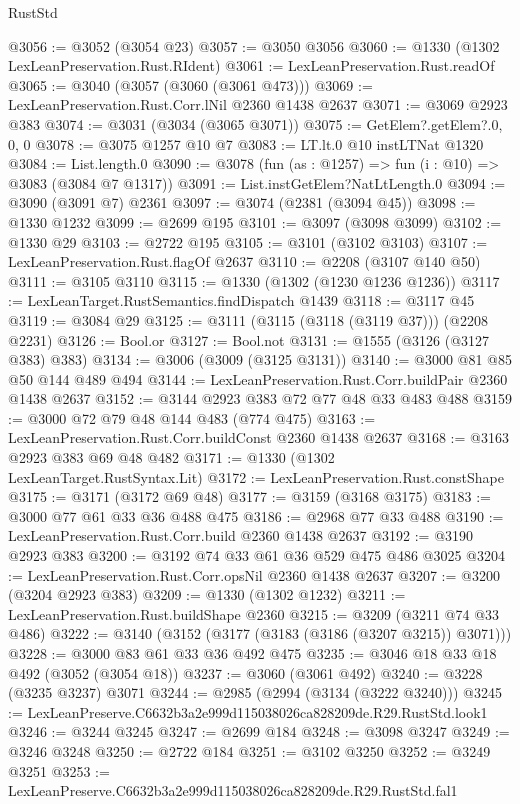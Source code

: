 \begin{lexlean}{RustStd}
\begin{coremodule}
@3056 := @3052 (@3054 @23)
@3057 := @3050 @3056
@3060 := @1330 (@1302 LexLeanPreservation.Rust.RIdent)
@3061 := LexLeanPreservation.Rust.readOf
@3065 := @3040 (@3057 (@3060 (@3061 @473)))
@3069 := LexLeanPreservation.Rust.Corr.lNil @2360 @1438 @2637
@3071 := @3069 @2923 @383
@3074 := @3031 (@3034 (@3065 @3071))
@3075 := GetElem?.getElem?.{0, 0, 0}
@3078 := @3075 @1257 @10 @7
@3083 := LT.lt.{0} @10 instLTNat @1320
@3084 := List.length.{0}
@3090 := @3078 (fun (as : @1257) => fun (i : @10) => @3083 (@3084 @7 @1317))
@3091 := List.instGetElem?NatLtLength.{0}
@3094 := @3090 (@3091 @7) @2361
@3097 := @3074 (@2381 (@3094 @45))
@3098 := @1330 @1232
@3099 := @2699 @195
@3101 := @3097 (@3098 @3099)
@3102 := @1330 @29
@3103 := @2722 @195
@3105 := @3101 (@3102 @3103)
@3107 := LexLeanPreservation.Rust.flagOf @2637
@3110 := @2208 (@3107 @140 @50)
@3111 := @3105 @3110
@3115 := @1330 (@1302 (@1230 @1236 @1236))
@3117 := LexLeanTarget.RustSemantics.findDispatch @1439
@3118 := @3117 @45
@3119 := @3084 @29
@3125 := @3111 (@3115 (@3118 (@3119 @37))) (@2208 @2231)
@3126 := Bool.or
@3127 := Bool.not
@3131 := @1555 (@3126 (@3127 @383) @383)
@3134 := @3006 (@3009 (@3125 @3131))
@3140 := @3000 @81 @85 @50 @144 @489 @494
@3144 := LexLeanPreservation.Rust.Corr.buildPair @2360 @1438 @2637
@3152 := @3144 @2923 @383 @72 @77 @48 @33 @483 @488
@3159 := @3000 @72 @79 @48 @144 @483 (@774 @475)
@3163 := LexLeanPreservation.Rust.Corr.buildConst @2360 @1438 @2637
@3168 := @3163 @2923 @383 @69 @48 @482
@3171 := @1330 (@1302 LexLeanTarget.RustSyntax.Lit)
@3172 := LexLeanPreservation.Rust.constShape
@3175 := @3171 (@3172 @69 @48)
@3177 := @3159 (@3168 @3175)
@3183 := @3000 @77 @61 @33 @36 @488 @475
@3186 := @2968 @77 @33 @488
@3190 := LexLeanPreservation.Rust.Corr.build @2360 @1438 @2637
@3192 := @3190 @2923 @383
@3200 := @3192 @74 @33 @61 @36 @529 @475 @486 @3025
@3204 := LexLeanPreservation.Rust.Corr.opsNil @2360 @1438 @2637
@3207 := @3200 (@3204 @2923 @383)
@3209 := @1330 (@1302 @1232)
@3211 := LexLeanPreservation.Rust.buildShape @2360
@3215 := @3209 (@3211 @74 @33 @486)
@3222 := @3140 (@3152 (@3177 (@3183 (@3186 (@3207 @3215)) @3071)))
@3228 := @3000 @83 @61 @33 @36 @492 @475
@3235 := @3046 @18 @33 @18 @492 (@3052 (@3054 @18))
@3237 := @3060 (@3061 @492)
@3240 := @3228 (@3235 @3237) @3071
@3244 := @2985 (@2994 (@3134 (@3222 @3240)))
@3245 := LexLeanPreserve.C6632b3a2e999d115038026ca828209de.R29.RustStd.look1
@3246 := @3244 @3245
@3247 := @2699 @184
@3248 := @3098 @3247
@3249 := @3246 @3248
@3250 := @2722 @184
@3251 := @3102 @3250
@3252 := @3249 @3251
@3253 := LexLeanPreserve.C6632b3a2e999d115038026ca828209de.R29.RustStd.fal1

\end{coremodule}
\end{lexlean}

